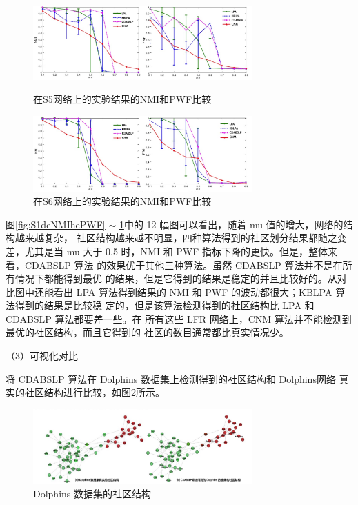 \begin{figure}
  \centering
  \includegraphics[width=0.75\textwidth]{figures/S5deNMIhePWF}
  \caption{在S5网络上的实验结果的NMI和PWF比较}\label{fig:S5deNMIhePWF}

  \includegraphics[width=0.75\textwidth]{figures/S6deNMIhePWF}
  \caption{在S6网络上的实验结果的NMI和PWF比较}\label{fig:S6deNMIhePWF}
\end{figure}

图\ref{fig:S1deNMIhePWF} $\sim$ \ref{fig:S6deNMIhePWF}中的 12 幅图可以看出，随着 mu 值的增大，网络的结构越来越复杂，
社区结构越来越不明显，四种算法得到的社区划分结果都随之变差，尤其是当
mu 大于 0.5 时，NMI 和 PWF 指标下降的更快。但是，整体来看，CDABSLP 算法
的效果优于其他三种算法。虽然 CDABSLP 算法并不是在所有情况下都能得到最优
的结果，但是它得到的结果是稳定的并且比较好的。从对比图中还能看出 LPA
算法得到结果的 NMI 和 PWF 的波动都很大；KBLPA 算法得到的结果是比较稳
定的，但是该算法检测得到的社区结构比 LPA 和 CDABSLP 算法都要差一些。在
所有这些 LFR 网络上，CNM 算法并不能检测到最优的社区结构，而且它得到的
社区的数目通常都比真实情况少。 



（3）可视化对比

将 CDABSLP 算法在 Dolphins 数据集上检测得到的社区结构和 Dolphins网络
真实的社区结构进行比较，如图\ref{fig:Dolphins}所示。

\begin{figure}
  \centering
  \includegraphics[width=0.75\textwidth]{figures/Dolphins}
  \caption{Dolphins 数据集的社区结构}\label{fig:Dolphins}
\end{figure}

